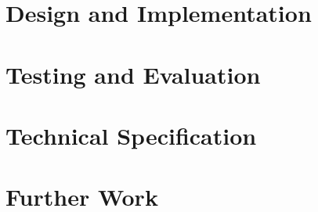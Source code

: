 \documentclass[a4paper,10pt]{article}
\begin{document}
\section{Design and Implementation}

\section{Testing and Evaluation}

\section{Technical Specification}

\section{Further Work}


\appendix

\pagebreak
\begin{thebibliography}{99}
\end{thebibliography}
\end{document}

